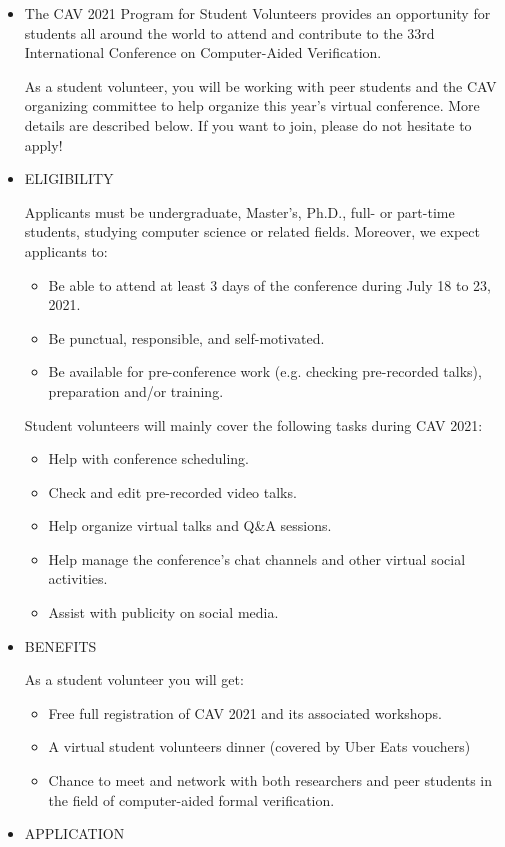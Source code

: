 \documentclass[prodmode,acmtecs]{acmsmall} %
\begin{document}
\begin{itemize}\item  The CAV 2021 Program for Student Volunteers provides an opportunity for students all around the world to attend and contribute to the 33rd International Conference on Computer-Aided Verification. 
 
  As a student volunteer, you will be working with peer students and the CAV organizing committee to help organize this year’s virtual conference. More details are described below. If you want to join, please do not hesitate to apply! 
 
\item  ELIGIBILITY 
 
  Applicants must be undergraduate, Master’s, Ph.D., full- or part-time students, studying computer science or related fields. Moreover, we expect applicants to: 
 
\begin{itemize}\item  Be able to attend at least 3 days of the conference during July 18 to 23, 2021.
\item  Be punctual, responsible, and self-motivated.
\item  Be available for pre-conference work (e.g. checking pre-recorded talks), preparation and/or training.
\end{itemize} 
  Student volunteers will mainly cover the following tasks during CAV 2021: 
 
\begin{itemize}\item  Help with conference scheduling.
\item  Check and edit pre-recorded video talks.
\item  Help organize virtual talks and Q\&A sessions.
\item  Help manage the conference’s chat channels and other virtual social activities.
\item  Assist with publicity on social media.
\end{itemize} 
\item  BENEFITS  
 
  As a student volunteer you will get: 
 
\begin{itemize}\item  Free full registration of CAV 2021 and its associated workshops.
\item  A virtual student volunteers dinner (covered by Uber Eats vouchers)
\item  Chance to meet and network with both researchers and peer students in the field of computer-aided formal verification.
\end{itemize} 
\item  APPLICATION 
 

\end{itemize}
\end{document}
